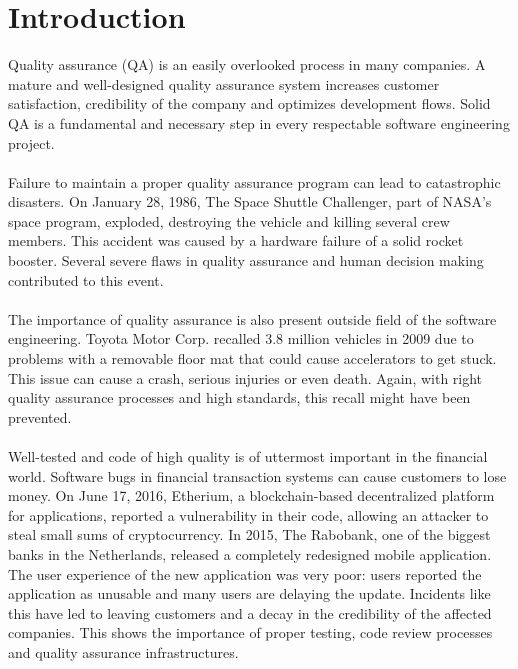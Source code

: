 \chapter{Introduction}

Quality assurance (QA) is an easily overlooked process in many companies. A mature and well-designed quality assurance system increases customer satisfaction, credibility of the company and optimizes development flows. Solid QA is a fundamental and necessary step in every respectable software engineering project.\\\\
Failure to maintain a proper quality assurance program can lead to catastrophic disasters. On January 28, 1986, The Space Shuttle Challenger, part of NASA's space program, exploded, destroying the vehicle and killing several crew members. This accident was caused by a hardware failure of a solid rocket booster. Several severe flaws in quality assurance and human decision making contributed to this event.\\\\
The importance of quality assurance is also present outside field of the software engineering. Toyota Motor Corp. recalled 3.8 million vehicles in 2009 due to problems with a removable floor mat that could cause accelerators to get stuck. This issue can cause a crash, serious injuries or even death. Again, with right quality assurance processes and high standards, this recall might have been prevented.\\\\
Well-tested and code of high quality is of uttermost important in the financial world. Software bugs in financial transaction systems can cause customers to lose money.
On June 17, 2016, Etherium, a blockchain-based decentralized platform for applications, reported a vulnerability in their code, allowing an attacker to steal small sums of cryptocurrency. In 2015, The Rabobank, one of the biggest banks in the Netherlands, released a completely redesigned mobile application. The user experience of the new application was very poor: users reported the application as unusable and many users are delaying the update. Incidents like this have led to leaving customers and a decay in the credibility of the affected companies. This shows the importance of proper testing, code review processes and quality assurance infrastructures.\\\\

